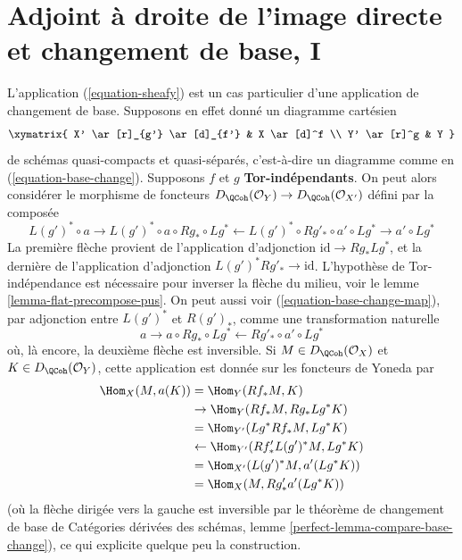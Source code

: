 \section{Adjoint à droite de l'image directe et changement de base, I}
\label{section-base-change-map}

\begingroup\emergencystretch=16pt
\noindent
L'application (\ref{equation-sheafy}) est un cas particulier d'une application de changement de base. Supposons en effet donné un diagramme cartésien
$$
\xymatrix{
X' \ar[r]_{g'} \ar[d]_{f'} & X \ar[d]^f \\
Y' \ar[r]^g & Y
}
$$
de schémas quasi-compacts et quasi-séparés, c'est-à-dire un diagramme comme en (\ref{equation-base-change}). Supposons $f$ et $g$ {\bf Tor-indépendants}. On peut alors considérer le morphisme de foncteurs
$D_\QCoh(\mathcal{O}_Y) \to D_\QCoh(\mathcal{O}_{X'})$
défini par la composée
\begin{equation}
\label{equation-base-change-map}
L(g')^* \circ a \to
L(g')^* \circ a \circ Rg_* \circ Lg^* \leftarrow
L(g')^* \circ Rg'_* \circ a' \circ Lg^* \to a' \circ Lg^*
\end{equation}
La première flèche provient de l'application d'adjonction $\text{id} \to Rg_* Lg^*$, et la dernière de l'application d'adjonction $L(g')^*Rg'_* \to \text{id}$. L'hypothèse de Tor-indépendance est nécessaire pour inverser la flèche du milieu, voir le lemme \ref{lemma-flat-precompose-pus}. On peut aussi voir (\ref{equation-base-change-map}), par adjonction entre $L(g')^*$ et $R(g')_*$, comme une transformation naturelle
$$
a \to a \circ Rg_* \circ Lg^* \leftarrow Rg'_* \circ a' \circ Lg^*
$$
où, là encore, la deuxième flèche est inversible. Si $M \in D_\QCoh(\mathcal{O}_X)$ et $K \in D_\QCoh(\mathcal{O}_Y)$, cette application est donnée sur les foncteurs de Yoneda par
\begin{align*}
\Hom_X(M, a(K))
& =
\Hom_Y(Rf_*M, K) \\
& \to
\Hom_Y(Rf_*M, Rg_* Lg^*K) \\
& =
\Hom_{Y'}(Lg^*Rf_*M, Lg^*K) \\
& \leftarrow
\Hom_{Y'}(Rf'_* L(g')^*M, Lg^*K) \\
& =
\Hom_{X'}(L(g')^*M, a'(Lg^*K)) \\
& =
\Hom_X(M, Rg'_*a'(Lg^*K))
\end{align*}
(où la flèche dirigée vers la gauche est inversible par le théorème de changement de base de Catégories dérivées des schémas, lemme \ref{perfect-lemma-compare-base-change}), ce qui explicite quelque peu la construction.\par\endgroup

